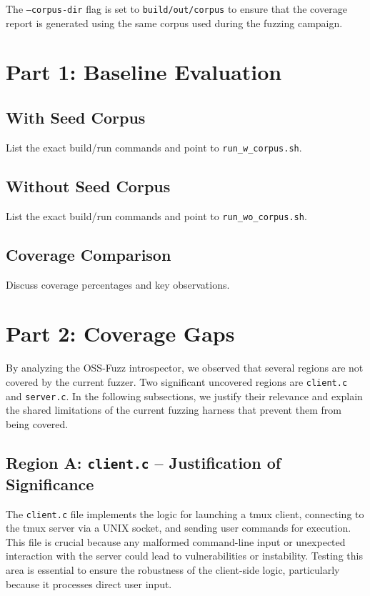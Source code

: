 \documentclass[11pt,a4paper,twocolumn]{article}
\begin{document}
The \texttt{---corpus-dir} flag is set to \texttt{build/out/corpus} to ensure that the coverage report is generated using the same corpus used during the fuzzing campaign.

\section{Part 1: Baseline Evaluation}

\subsection{With Seed Corpus}

List the exact build/run commands and point to \texttt{run\_w\_corpus.sh}.

\subsection{Without Seed Corpus}
List the exact build/run commands and point to \texttt{run\_wo\_corpus.sh}.

\subsection{Coverage Comparison}
Discuss coverage percentages and key observations.

\section{Part 2: Coverage Gaps}
By analyzing the OSS-Fuzz introspector, we observed that several regions are not covered by the current fuzzer. Two significant uncovered regions are \texttt{client.c} and \texttt{server.c}. In the following subsections, we justify their relevance and explain the shared limitations of the current fuzzing harness that prevent them from being covered.

\subsection{Region A: \texttt{client.c} – Justification of Significance}
The \texttt{client.c} file implements the logic for launching a tmux client, connecting to the tmux server via a UNIX socket, and sending user commands for execution. This file is crucial because any malformed command-line input or unexpected interaction with the server could lead to vulnerabilities or instability. Testing this area is essential to ensure the robustness of the client-side logic, particularly because it processes direct user input.
\end{document}
